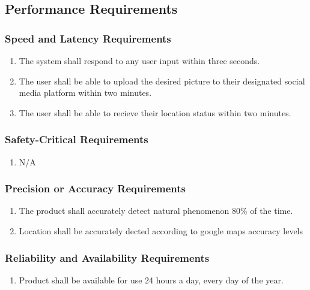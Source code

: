 \documentclass[]{article}
\begin{document}

\subsection{Performance Requirements}
\label{sub:performance_requirements}

\subsubsection{Speed and Latency Requirements}
\label{ssub:speed_and_latency_requirements}
\begin{enumerate}[{PR}1. ]
	\item The system shall respond to any user input within three seconds.
	\item The user shall be able to upload the desired picture to their designated social media platform within two minutes.
	\item The user shall be able to recieve their location status within two minutes. %
\end{enumerate}

\subsubsection{Safety-Critical Requirements}
\label{ssub:safety_critical_requirements}
\begin{enumerate}[{PR}1. ]
	\item N/A
\end{enumerate}

\subsubsection{Precision or Accuracy Requirements}
\label{ssub:precision_or_accuracy_requirements}
\begin{enumerate}[{PR}1. ]
	\item The product shall accurately detect natural phenomenon 80\% of the time. %
	\item Location shall be accurately dected according to google maps accuracy levels %
\end{enumerate}

\subsubsection{Reliability and Availability Requirements}
\label{ssub:reliability_and_availability_requirements}
\begin{enumerate}[{PR}1. ]
	\item Product shall be available for use 24 hours a day, every day of the year.
\end{enumerate}
\end{document}
